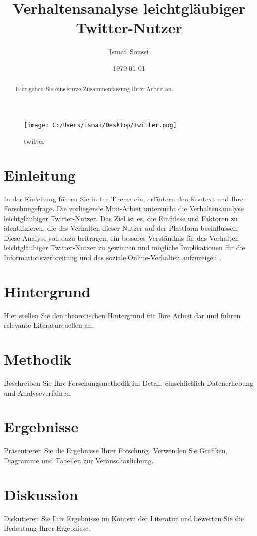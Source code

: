 \documentclass{article}
\title{Verhaltensanalyse leichtgläubiger Twitter-Nutzer}
\author{Ismail Soussi}
\date{\today}
\begin{document}
	
	\begin{figure}
		\centering
		\texttt{[image: C:/Users/ismai/Desktop/twitter.png]}
		\caption{twitter}
		\label{fig:twitter}
	\end{figure}
	
	\maketitle
	
	\begin{abstract}
		Hier geben Sie eine kurze Zusammenfassung Ihrer Arbeit an.
	\end{abstract}
	
	\section{Einleitung}
	In der Einleitung führen Sie in Ihr Thema ein, erläutern den Kontext und Ihre Forschungsfrage. Die vorliegende Mini-Arbeit untersucht die Verhaltensanalyse leichtgläubiger Twitter-Nutzer. Das Ziel ist es, die Einflüsse und Faktoren zu identifizieren, die das Verhalten dieser Nutzer auf der Plattform beeinflussen. Diese Analyse soll dazu beitragen, ein besseres Verständnis für das Verhalten leichtgläubiger Twitter-Nutzer zu gewinnen und mögliche Implikationen für die Informationsverbreitung und das soziale Online-Verhalten aufzuzeigen \cite{twitter2012twitter}.
	
	\section{Hintergrund}
	Hier stellen Sie den theoretischen Hintergrund für Ihre Arbeit dar und führen relevante Literaturquellen an.
	
	\section{Methodik}
	Beschreiben Sie Ihre Forschungsmethodik im Detail, einschließlich Datenerhebung und Analyseverfahren.
	
	\section{Ergebnisse}
	Präsentieren Sie die Ergebnisse Ihrer Forschung. Verwenden Sie Grafiken, Diagramme und Tabellen zur Veranschaulichung.
	
	\section{Diskussion}
	Diskutieren Sie Ihre Ergebnisse im Kontext der Literatur und bewerten Sie die Bedeutung Ihrer Ergebnisse.
	
\end{document}
